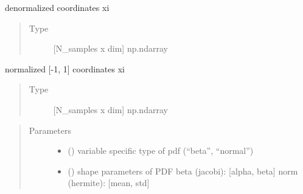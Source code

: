 \documentclass[letterpaper,10pt,english,openany,oneside]{sphinxmanual}
\begin{document}
\begin{fulllineitems}
\begin{fulllineitems}
\begin{quote}
\begin{description}
\end{description}\end{quote}

\end{fulllineitems}


\begin{fulllineitems}
\label{\detokenize{pygpc:pygpc.grid.RandomGrid.coords}}
denormalized coordinates xi
\begin{quote}\begin{description}
\item[{Type}] \leavevmode
{[}N\_samples x dim{]} np.ndarray

\end{description}\end{quote}

\end{fulllineitems}


\begin{fulllineitems}
\label{\detokenize{pygpc:pygpc.grid.RandomGrid.coords_norm}}
normalized {[}-1, 1{]} coordinates xi
\begin{quote}\begin{description}
\item[{Type}] \leavevmode
{[}N\_samples x dim{]} np.ndarray

\end{description}\end{quote}

\end{fulllineitems}

\begin{quote}\begin{description}
\item[{Parameters}] \leavevmode\begin{itemize}
\item {} 
 (\sphinxstyleliteralemphasis{\sphinxupquote{{[}}}\sphinxstyleliteralemphasis{\sphinxupquote{{]} }}) \textendash{} variable specific type of pdf (“beta”, “normal”)

\item {} 
 (\sphinxstyleliteralemphasis{\sphinxupquote{{[}}}\sphinxstyleliteralemphasis{\sphinxupquote{{]} }}) \textendash{} shape parameters of PDF
beta (jacobi):  {[}alpha, beta{]}
norm (hermite): {[}mean, std{]}


\end{itemize}
\end{description}
\end{quote}
\end{fulllineitems}
\end{document}
